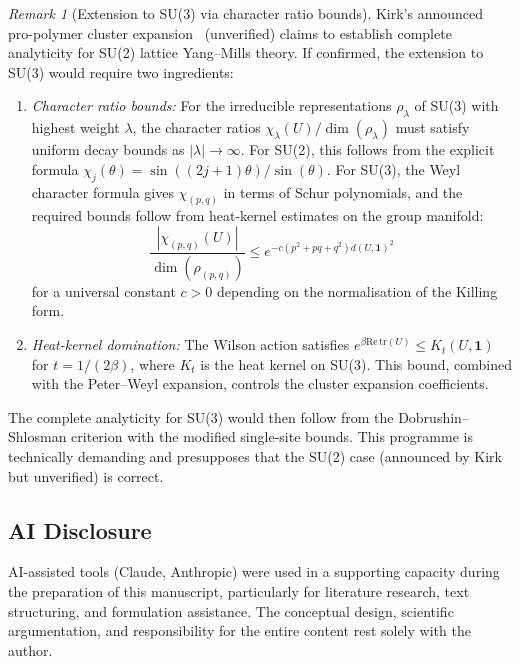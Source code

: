 \documentclass[12pt,a4paper]{article}
\theoremstyle{definition}
\theoremstyle{plain}
\theoremstyle{remark}
\newtheorem{remark}[definition]{Remark}
\begin{document}
\begin{remark}[Extension to SU(3) via character ratio bounds]
\label{rem:su3-extension}
Kirk's announced pro-polymer cluster expansion~\cite{Kirk2026} (unverified) claims to establish complete analyticity for SU(2) lattice Yang--Mills theory. If confirmed, the extension to SU(3) would require two ingredients:
\begin{enumerate}
\item \emph{Character ratio bounds:} For the irreducible representations $\rho_\lambda$ of SU(3) with highest weight $\lambda$, the character ratios $\chi_\lambda(U)/\dim(\rho_\lambda)$ must satisfy uniform decay bounds as $|\lambda| \to \infty$. For SU(2), this follows from the explicit formula $\chi_j(\theta) = \sin((2j+1)\theta)/\sin(\theta)$. For SU(3), the Weyl character formula gives $\chi_{(p,q)}$ in terms of Schur polynomials, and the required bounds follow from heat-kernel estimates on the group manifold:
\[
\frac{|\chi_{(p,q)}(U)|}{\dim(\rho_{(p,q)})} \leq e^{-c(p^2 + pq + q^2) d(U, \mathbf{1})^2}
\]
for a universal constant $c > 0$ depending on the normalisation of the Killing form.
\item \emph{Heat-kernel domination:} The Wilson action satisfies $e^{\beta \mathrm{Re}\,\mathrm{tr}(U)} \leq K_t(U, \mathbf{1})$ for $t = 1/(2\beta)$, where $K_t$ is the heat kernel on SU(3). This bound, combined with the Peter--Weyl expansion, controls the cluster expansion coefficients.
\end{enumerate}
The complete analyticity for SU(3) would then follow from the Dobrushin--Shlosman criterion with the modified single-site bounds. This programme is technically demanding and presupposes that the SU(2) case (announced by Kirk~\cite{Kirk2026} but unverified) is correct.
\end{remark}

\subsection*{AI Disclosure}
AI-assisted tools (Claude, Anthropic) were used in a supporting capacity during the
preparation of this manuscript, particularly for literature research,
text structuring, and formulation assistance. The conceptual design,
scientific argumentation, and responsibility for the entire content
rest solely with the author.
\end{document}
